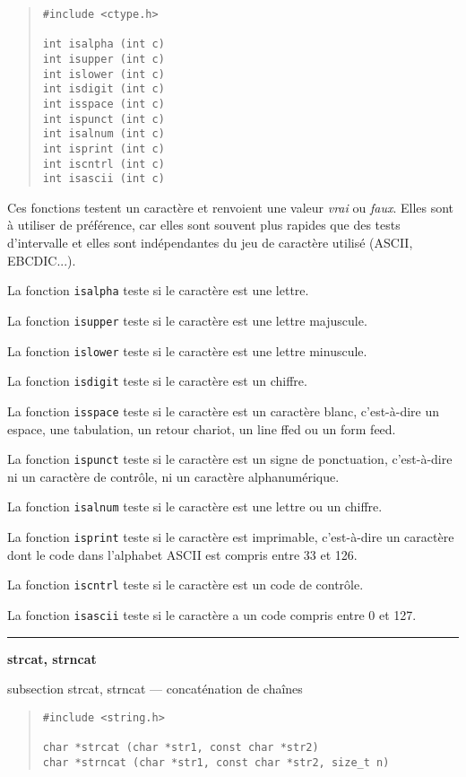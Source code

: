 \documentclass [twoside] {report}
\newcommand {\primitive} [1]
    {
	{\large \bf #1}
	\addcontentsline {toc} {subsection} {#1}
    }
\newcommand {\separation}
    {
	\vspace {7mm}
	\nopagebreak
	\hrule
    }
\begin{document}
\begin {quote}
\begin {verbatim}
#include <ctype.h>

int isalpha (int c)
int isupper (int c)
int islower (int c)
int isdigit (int c)
int isspace (int c)
int ispunct (int c)
int isalnum (int c)
int isprint (int c)
int iscntrl (int c)
int isascii (int c)
\end{verbatim}
\end {quote}

Ces fonctions testent un caractère et renvoient une valeur
{\em vrai} ou {\em faux}. Elles sont à utiliser de préférence, car
elles sont souvent plus rapides que des tests d'intervalle
et elles sont indépendantes du jeu de caractère utilisé
(ASCII, EBCDIC...).

La fonction {\tt isalpha} teste si le caractère est une
lettre.

La fonction {\tt isupper} teste si le caractère est une
lettre majuscule.

La fonction {\tt islower} teste si le caractère est une
lettre minuscule.

La fonction {\tt isdigit} teste si le caractère est un
chiffre.

La fonction {\tt isspace} teste si le caractère est un
caractère blanc, c'est-à-dire un espace, une tabulation, un
retour chariot, un line ffed ou un form feed.

La fonction {\tt ispunct} teste si le caractère est un
signe de ponctuation, c'est-à-dire ni un caractère de
contrôle, ni un caractère alphanumérique.

La fonction {\tt isalnum} teste si le caractère est une
lettre ou un chiffre.

La fonction {\tt isprint} teste si le caractère est
imprimable, c'est-à-dire un caractère dont le code dans
l'alphabet ASCII est compris entre 33 et 126.

La fonction {\tt iscntrl} teste si le caractère est un
code de contrôle.

La fonction {\tt isascii} teste si le caractère a un code
compris entre 0 et 127.


\separation 
\primitive {strcat, strncat} --- concaténation de chaînes

\begin {quote}
\begin {verbatim}
#include <string.h>

char *strcat (char *str1, const char *str2)
char *strncat (char *str1, const char *str2, size_t n)
\end{verbatim}
\end {quote}
\end{document}
